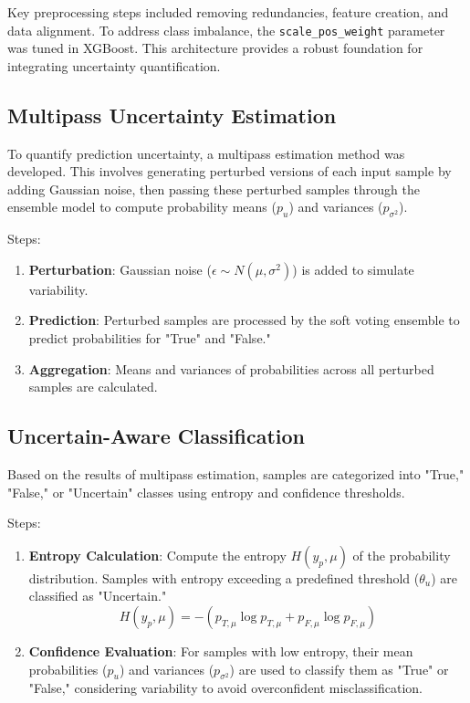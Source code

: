 \documentclass{ieeeaccess}
\begin{document}
Key preprocessing steps included removing redundancies, feature creation, and data alignment. To address class imbalance, the \texttt{scale\_pos\_weight}
parameter was tuned in XGBoost. This architecture provides a robust foundation for integrating uncertainty quantification.

\subsection{Multipass Uncertainty Estimation}
To quantify prediction uncertainty, a multipass estimation method was developed. This involves generating perturbed versions of each input sample by adding Gaussian noise, then passing these perturbed samples through the ensemble model to compute probability means ($p_{u}$) and variances ($p_{\sigma^2}$).

Steps:
\begin{enumerate}
    \item \textbf{Perturbation}: Gaussian noise ($\epsilon \sim N(\mu, \sigma^2)$) is added to simulate variability.
    \item \textbf{Prediction}: Perturbed samples are processed by the soft voting ensemble to predict probabilities for "True" and "False."
    \item \textbf{Aggregation}: Means and variances of probabilities across all perturbed samples are calculated.
\end{enumerate}

\subsection{Uncertain-Aware Classification}
Based on the results of multipass estimation, samples are categorized into "True," "False," or "Uncertain" classes using entropy and confidence thresholds.

Steps:
\begin{enumerate}
    \item \textbf{Entropy Calculation}: Compute the entropy $H(y_p,\mu)$ of the probability distribution. Samples with entropy exceeding a predefined threshold ($\theta_{u}$) are classified as "Uncertain."
    \begin{equation}
    H(y_p,\mu) = -(p_{T,\mu}\log p_{T,\mu}+p_{F,\mu}\log p_{F,\mu})
    \end{equation}
    \item \textbf{Confidence Evaluation}: For samples with low entropy, their mean probabilities ($p_{u}$) and variances ($p_{\sigma^2}$) are used to classify them as "True" or "False," considering variability to avoid overconfident misclassification.
\end{enumerate}
\end{document}
